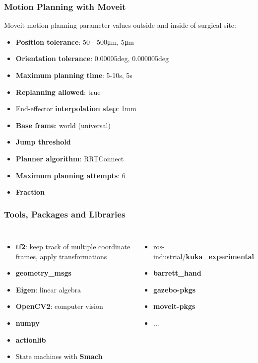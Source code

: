 \begin{frame}
\frametitle{Motion Planning with Moveit}
Moveit motion planning parameter values outside and inside of surgical site:
\begin{itemize}
	\item \textbf{Position tolerance}: 50 - 500μm, 5μm
	\item \textbf{Orientation tolerance}: 0.00005deg, 0.000005deg
	\item \textbf{Maximum planning time}: 5-10s, 5s
	\item \textbf{Replanning allowed}: true
	\item End-effector \textbf{interpolation step}: 1mm
	\item \textbf{Base frame}: world (universal)
	\item \textbf{Jump threshold}
	\item \textbf{Planner algorithm}: RRTConnect
	\item \textbf{Maximum planning attempts}: 6
	\item \textbf{Fraction}
\end{itemize}
\end{frame}

\begin{frame}
\frametitle{Tools, Packages and Libraries}
\begin{columns}[t]
\begin{itemize}
\item \textbf{tf2}: keep track of multiple coordinate frames, apply transformations
\item \textbf{geometry\_msgs}
\item \textbf{Eigen}: linear algebra
\item \textbf{OpenCV2}: computer vision
\item \textbf{numpy}
\item \textbf{actionlib}
\item State machines with \textbf{Smach}
\end{itemize}

\begin{itemize}
\item  ros-industrial/\textbf{kuka\_experimental }
\item \textbf{barrett\_hand}
\item \textbf{gazebo-pkgs}
\item \textbf{moveit-pkgs}
\item ...
\end{itemize}
\end{columns}
\end{frame}